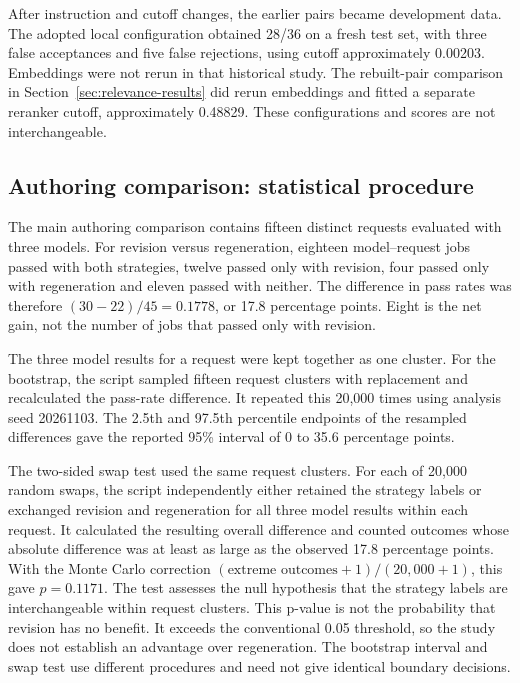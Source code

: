 After instruction and cutoff changes, the earlier pairs became development data. The adopted local configuration obtained 28/36 on a fresh test set, with three false acceptances and five false rejections, using cutoff approximately 0.00203. Embeddings were not rerun in that historical study. The rebuilt-pair comparison in Section~\ref{sec:relevance-results} did rerun embeddings and fitted a separate reranker cutoff, approximately 0.48829. These configurations and scores are not interchangeable.

\subsection{Authoring comparison: statistical procedure}\label{app:authoring-statistics}

The main authoring comparison contains fifteen distinct requests evaluated with three models. For revision versus regeneration, eighteen model--request jobs passed with both strategies, twelve passed only with revision, four passed only with regeneration and eleven passed with neither. The difference in pass rates was therefore $(30-22)/45=0.1778$, or 17.8 percentage points. Eight is the net gain, not the number of jobs that passed only with revision.

The three model results for a request were kept together as one cluster. For the bootstrap, the script sampled fifteen request clusters with replacement and recalculated the pass-rate difference. It repeated this 20,000 times using analysis seed 20261103. The 2.5th and 97.5th percentile endpoints of the resampled differences gave the reported 95\% interval of 0 to 35.6 percentage points.

The two-sided swap test used the same request clusters. For each of 20,000 random swaps, the script independently either retained the strategy labels or exchanged revision and regeneration for all three model results within each request. It calculated the resulting overall difference and counted outcomes whose absolute difference was at least as large as the observed 17.8 percentage points. With the Monte Carlo correction $(\text{extreme outcomes}+1)/(20{,}000+1)$, this gave $p=0.1171$. The test assesses the null hypothesis that the strategy labels are interchangeable within request clusters. This p-value is not the probability that revision has no benefit. It exceeds the conventional 0.05 threshold, so the study does not establish an advantage over regeneration. The bootstrap interval and swap test use different procedures and need not give identical boundary decisions.

